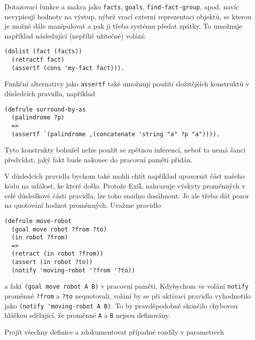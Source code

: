 Dotazovací funkce a makra jako \verb|facts|, \verb|goals|,
\verb|find-fact-group|, apod. navíc nevypisují hodnoty na výstup, nýbrž vrací
externí reprezentaci objektů, se kterou je možné dále manipulovat a pak ji třeba
systému předat zpátky. To umožnuje například následující (nepříliš užitečné)
volání:
\begin{verbatim}
(dolist (fact (facts))
  (retractf fact)
  (assertf (cons 'my-fact fact))).
\end{verbatim}

Funkční alternativy jako \verb|assertf| také umožnuji použití složitějších
konstruktů v důsledcích pravidla, například
\begin{verbatim}
(defrule surround-by-as
  (palindrome ?p)
  =>
  (assertf `(palindrome ,(concatenate 'string "a" ?p "a")))).
\end{verbatim}
Tyto konstrukty bohužel nelze použít se zpětnou inferencí, neboť ta nemá šanci
předvídat, jaký fakt bude nakonec do pracovní paměti přidán.

V důsledcích pravidla bychom také mohli chtít například upozornit část našeho
kódu na událost, ke které došlo. Protože ExiL nahrazuje výskyty
proměnných v celé důsledkové části pravidla, lze toho snadno dosáhnout. Je ale
třeba dát pozor na quotování hodnot proměnných. Uvažme pravidlo
\begin{verbatim}
(defrule move-robot
  (goal move robot ?from ?to)
  (in robot ?from)
  =>
  (retract (in robot ?from))
  (assert (in robot ?to))
  (notify 'moving-robot '?from '?to))
\end{verbatim}
a fakt \verb|(goal move robot A B)| v pracovní paměti. Kdybychom ve volání
\verb|notify| proměnné \verb|?from| a \verb|?to| nequotovali, volání by se při
aktivaci pravidla vyhodnotilo jako \verb|(notify 'moving-robot A B)|. To by
pravděpodobně skončilo chybovou hláškou sdělující, že proměnné \verb|A| a
\verb|B| nejsou definovány.

\begin{framed}
Projít všechny definice a zdokumentovat případné rozdíly v parametrech
\end{framed}
